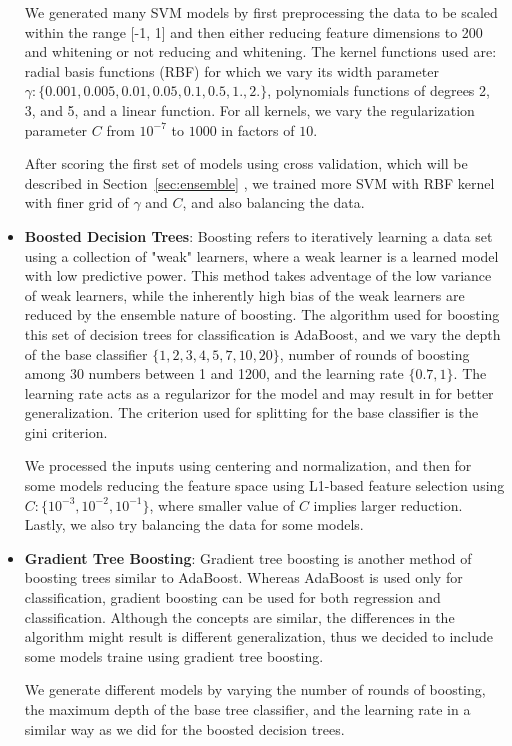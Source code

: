\documentclass{article}
\renewcommand{\(}{\left(}
\renewcommand{\)}{\right)}
\begin{document}
\begin{itemize}
      We generated many SVM models by first preprocessing the data to be scaled within the range [-1, 1] and then either reducing feature dimensions to 200 and whitening or not reducing and whitening.  The kernel functions used are: radial basis functions (RBF) for which we vary its width parameter $\gamma:\{0.001, 0.005, 0.01, 0.05, 0.1, 0.5, 1., 2.\}$, polynomials functions of degrees 2, 3, and 5, and a linear function. For all kernels, we vary the regularization parameter $C$ from $10^{-7}$ to $1000$ in factors of $10$.    

      After scoring the first set of models using cross validation, which will be described in Section~\ref{sec:ensemble} , we trained more SVM with RBF kernel with finer grid of $\gamma$ and $C$, and also balancing the data.

    \item \textbf{Boosted Decision Trees}: Boosting refers to iteratively learning a data set using a collection of "weak" learners, where a weak learner is a learned model with low predictive power.  This method takes adventage of the low variance of weak learners, while the inherently high bias of the weak learners are reduced by the ensemble nature of boosting.  The algorithm used for boosting this set of decision trees for classification is AdaBoost, and we vary the depth of the base classifier $\{1, 2, 3, 4, 5, 7, 10, 20\}$, number of rounds of boosting among 30 numbers between 1 and 1200, and the learning rate $\{0.7, 1\}$.  The learning rate acts as a regularizor for the model and may result in for better generalization.  The criterion used for splitting for the base classifier is the gini criterion. 

      We processed the inputs using centering and normalization, and then for some models reducing the feature space using L1-based feature selection using $C:\{10^{-3}, 10^{-2}, 10^{-1}\}$, where smaller value of $C$ implies larger reduction. Lastly, we also try balancing the data for some models.

    \item \textbf{Gradient Tree Boosting}: Gradient tree boosting is another method of boosting trees similar to AdaBoost.  Whereas AdaBoost is used only for classification, gradient boosting can be used for both regression and classification.  Although the concepts are similar, the differences in the algorithm might result is different generalization, thus we decided to include some models traine using gradient tree boosting.

      We generate different models by varying the number of rounds of boosting, the maximum depth of the base tree classifier, and the learning rate in a similar way as we did for the boosted decision trees. 


\end{itemize}
\end{document}
